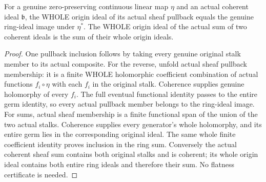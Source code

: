 \begin{theorem}
\label{hir:relative-normal-analytic-graph-origin-ideal-operations}
\leanok
{}
For a genuine zero-preserving continuous linear map $\eta$ and an actual
coherent ideal $\mathfrak b$, the WHOLE origin ideal of its actual sheaf
pullback equals the genuine ring-ideal image under $\eta^*$.
The WHOLE origin ideal of the actual sum of two coherent ideals is the
sum of their whole origin ideals.
\end{theorem}
\begin{proof}
One pullback inclusion follows by taking every genuine original stalk
member to its actual composite. For the reverse, unfold actual sheaf
pullback membership: it is a finite WHOLE holomorphic coefficient
combination of actual functions $f_i\circ\eta$ with each $f_i$ in the
original stalk. Coherence supplies genuine holomorphy of every $f_i$.
The full eventual functional identity passes to the entire germ identity,
so every actual pullback member belongs to the ring-ideal image.
For sums, actual sheaf membership is a finite functional span of the
union of the two actual stalks. Coherence supplies every generator's
whole holomorphy, and its entire germ lies in the corresponding original
ideal. The same whole finite coefficient identity proves inclusion in the
ring sum. Conversely the actual coherent sheaf sum contains both original
stalks and is coherent; its whole origin ideal contains both entire ring
ideals and therefore their sum. No flatness certificate is needed.
\end{proof}

